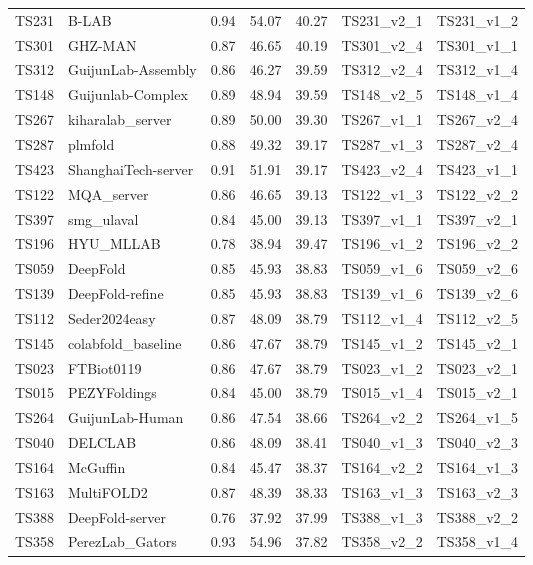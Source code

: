 \begin{longtable}{lllllll}
TS231 & B-LAB & 0.94 & 54.07 & 40.27 & TS231\_v2\_1 & TS231\_v1\_2 \\ 
TS301 & GHZ-MAN & 0.87 & 46.65 & 40.19 & TS301\_v2\_4 & TS301\_v1\_1 \\ 
TS312 & GuijunLab-Assembly & 0.86 & 46.27 & 39.59 & TS312\_v2\_4 & TS312\_v1\_4 \\ 
TS148 & Guijunlab-Complex & 0.89 & 48.94 & 39.59 & TS148\_v2\_5 & TS148\_v1\_4 \\ 
TS267 & kiharalab\_server & 0.89 & 50.00 & 39.30 & TS267\_v1\_1 & TS267\_v2\_4 \\ 
TS287 & plmfold & 0.88 & 49.32 & 39.17 & TS287\_v1\_3 & TS287\_v2\_4 \\ 
TS423 & ShanghaiTech-server & 0.91 & 51.91 & 39.17 & TS423\_v2\_4 & TS423\_v1\_1 \\ 
TS122 & MQA\_server & 0.86 & 46.65 & 39.13 & TS122\_v1\_3 & TS122\_v2\_2 \\ 
TS397 & smg\_ulaval & 0.84 & 45.00 & 39.13 & TS397\_v1\_1 & TS397\_v2\_1 \\ 
TS196 & HYU\_MLLAB & 0.78 & 38.94 & 39.47 & TS196\_v1\_2 & TS196\_v2\_2 \\ 
TS059 & DeepFold & 0.85 & 45.93 & 38.83 & TS059\_v1\_6 & TS059\_v2\_6 \\ 
TS139 & DeepFold-refine & 0.85 & 45.93 & 38.83 & TS139\_v1\_6 & TS139\_v2\_6 \\ 
TS112 & Seder2024easy & 0.87 & 48.09 & 38.79 & TS112\_v1\_4 & TS112\_v2\_5 \\ 
TS145 & colabfold\_baseline & 0.86 & 47.67 & 38.79 & TS145\_v1\_2 & TS145\_v2\_1 \\ 
TS023 & FTBiot0119 & 0.86 & 47.67 & 38.79 & TS023\_v1\_2 & TS023\_v2\_1 \\ 
TS015 & PEZYFoldings & 0.84 & 45.00 & 38.79 & TS015\_v1\_4 & TS015\_v2\_1 \\ 
TS264 & GuijunLab-Human & 0.86 & 47.54 & 38.66 & TS264\_v2\_2 & TS264\_v1\_5 \\ 
TS040 & DELCLAB & 0.86 & 48.09 & 38.41 & TS040\_v1\_3 & TS040\_v2\_3 \\ 
TS164 & McGuffin & 0.84 & 45.47 & 38.37 & TS164\_v2\_2 & TS164\_v1\_3 \\ 
TS163 & MultiFOLD2 & 0.87 & 48.39 & 38.33 & TS163\_v1\_3 & TS163\_v2\_3 \\ 
TS388 & DeepFold-server & 0.76 & 37.92 & 37.99 & TS388\_v1\_3 & TS388\_v2\_2 \\ 
TS358 & PerezLab\_Gators & 0.93 & 54.96 & 37.82 & TS358\_v2\_2 & TS358\_v1\_4 \\ 

\end{longtable}
